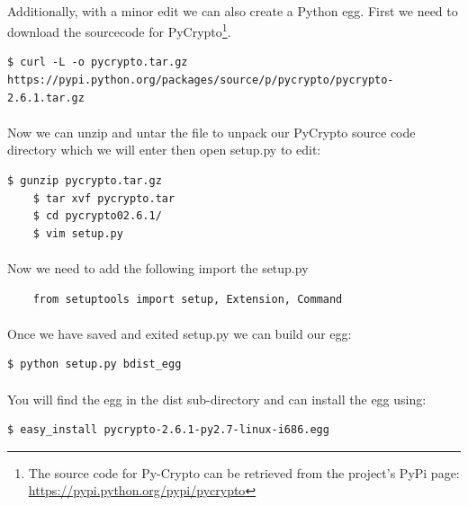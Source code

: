 \documentclass[12pt, a4paper, twoside]{book}
\begin{document}
\paragraph{} Additionally, with a minor edit we can also create a Python egg. First we need to download the sourcecode for PyCrypto\footnote{The source code for Py-Crypto can be retrieved from the project's PyPi page: \url{https://pypi.python.org/pypi/pycrypto}}.

\begin{lstlisting}[style=DOS]
    $ curl -L -o pycrypto.tar.gz https://pypi.python.org/packages/source/p/pycrypto/pycrypto-2.6.1.tar.gz
\end{lstlisting}

\paragraph{} Now we can unzip and untar the file to unpack our PyCrypto source code directory which we will enter then open setup.py to edit:

\begin{lstlisting}[style=DOS]
    $ gunzip pycrypto.tar.gz 
    $ tar xvf pycrypto.tar
    $ cd pycrypto02.6.1/
    $ vim setup.py
\end{lstlisting}

\paragraph{} Now we need to add the following import the setup.py

\begin{lstlisting}
    from setuptools import setup, Extension, Command
\end{lstlisting}

\paragraph{} Once we have saved and exited setup.py we can build our egg:
\begin{lstlisting}[style=DOS]
    $ python setup.py bdist_egg
\end{lstlisting}

\paragraph{} You will find the egg in the dist sub-directory and can install the egg using:
\begin{lstlisting}[style=DOS]
    $ easy_install pycrypto-2.6.1-py2.7-linux-i686.egg
\end{lstlisting}
\end{document}

